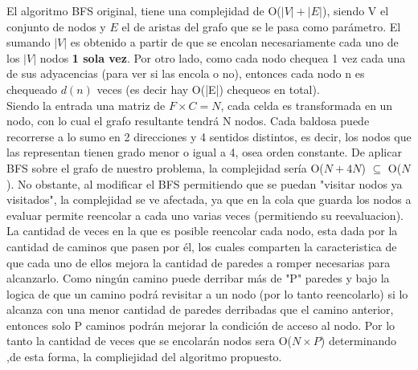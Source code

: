  El algoritmo BFS original, tiene una complejidad de O($|V|+|E|$), siendo V el conjunto de nodos y $E$ el de aristas del grafo que se le pasa como parámetro. El sumando $|V|$ es obtenido a partir de que se encolan necesariamente cada uno de los $|V|$ nodos {\bf 1 sola vez}. Por otro lado, como cada nodo chequea 1 vez cada una de sus adyacencias (para ver si las encola o no), entonces cada nodo n es chequeado $d(n)$ veces (es decir hay O(|E|) chequeos en total). \\

Siendo la entrada una matriz de $F \times C = N$, cada celda es transformada en un nodo, con lo cual el grafo resultante tendrá N nodos. Cada baldosa puede recorrerse a lo sumo en 2 direcciones y 4 sentidos distintos, es decir, los nodos que las representan tienen grado menor o igual a 4, osea orden constante. De aplicar BFS sobre el grafo de nuestro problema, la complejidad sería O($N + 4N$) $\subseteq$ O($N$).
No obstante, al modificar el BFS permitiendo que se puedan "visitar nodos ya visitados", la complejidad se ve afectada, ya que en la cola que guarda los nodos a evaluar permite reencolar a cada uno varias veces (permitiendo su reevaluacion).\\

La cantidad de veces en la que es posible reencolar cada nodo, esta dada por la cantidad de caminos que pasen por él, los cuales comparten la caracteristica de que cada uno de ellos mejora la cantidad de paredes a romper necesarias para alcanzarlo. Como ningún camino puede derribar más de "P" paredes y bajo la logica de que un camino podrá revisitar a un nodo (por lo tanto reencolarlo) si lo alcanza con una menor cantidad de paredes derribadas que el camino anterior, entonces solo P caminos podrán mejorar la condición de acceso al nodo. Por lo tanto la cantidad de veces que se encolarán nodos sera O($N \times P$) determinando ,de esta forma, la compliejidad del algoritmo propuesto.







